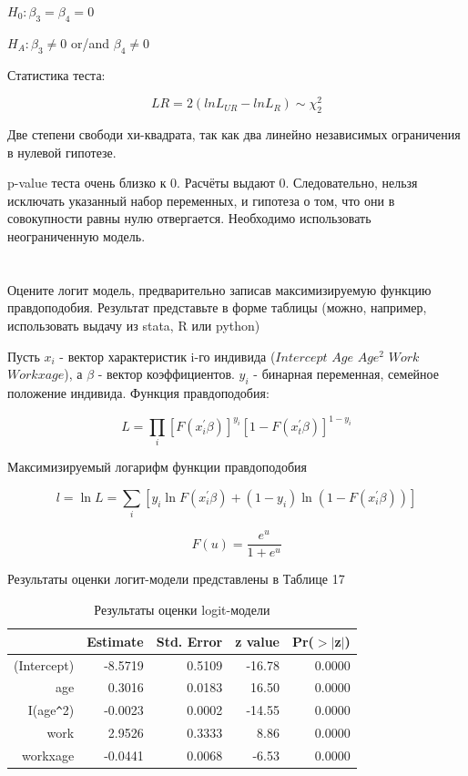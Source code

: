\documentclass[a4paper,12pt]{article}
\def \b{\beta}
\begin{document}
$ H_0: \b_3 = \b_4 = 0 $

$ H_A:  \b_3 \neq 0 $ or/and $ \b_4 \neq 0 $

Статистика теста:

\[ LR = 2(lnL_{UR} - lnL_{R}) \sim \chi^2_2\]

Две степени свободи хи-квадрата, так как два линейно независимых ограничения в нулевой гипотезе.

p-value теста очень близко к 0. Расчёты выдают 0. Следовательно, нельзя исключать указанный набор переменных, и гипотеза о том, что они в совокупности равны нулю отвергается. Необходимо использовать неограниченную модель.


\section{}

\subsection{}
\Sun  Оцените логит модель, предварительно записав максимизируемую функцию
правдоподобия. Результат представьте в форме таблицы (можно, например, использовать
выдачу из stata, R или python)


Пусть $ x_i $ - вектор характеристик i-го индивида ($ Intercept $ $  Age  $ $ Age^2 $ $ Work  $ $ Workxage $), а $ \b $ - вектор коэффициентов. $ y_i $ - бинарная переменная, семейное положение индивида. Функция правдоподобия:

\[
L=\prod_{i}\left[F\left(x_{i}^{\prime} \beta\right)\right]^{y_{i}}\left[1-F\left(x_{t}^{\prime} \beta\right)\right]^{1-y_{i}}
\]

Максимизируемый логарифм функции правдоподобия

\[
l=\ln L=\sum_{i}\left[y_{i} \ln F\left(x_{i}^{\prime} \beta\right)+\left(1-y_{i}\right) \ln \left(1-F\left(x_{i}^{\prime} \beta\right)\right)\right]
\]

\[
F(u)=\frac{e^{u}}{1+e^{u}}
\]

Результаты оценки логит-модели представлены в Таблице 17


\begin{table}[ht]
	\centering
	\begin{tabular}{|rrrrr|}
		\hline
		& Estimate & Std. Error & z value & Pr($>$$|$z$|$) \\ 
		\hline
		(Intercept) & -8.5719 & 0.5109 & -16.78 & 0.0000 \\ 
		age & 0.3016 & 0.0183 & 16.50 & 0.0000 \\ 
		I(age\verb|^|2) & -0.0023 & 0.0002 & -14.55 & 0.0000 \\ 
		work & 2.9526 & 0.3333 & 8.86 & 0.0000 \\ 
		workxage & -0.0441 & 0.0068 & -6.53 & 0.0000 \\ 
		\hline
	\end{tabular}
\caption{Результаты оценки logit-модели}
\end{table}
\end{document}
